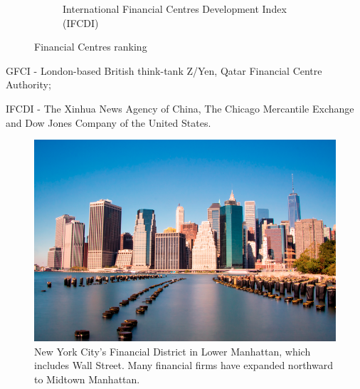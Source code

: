 \documentclass[international_finance_p1.tex]{subfiles}
\begin{document}
\begin{frame}[shrink=20]
\begin{figure}
\begin{subfigure}[t]{5.1cm}
		\caption{International Financial Centres Development Index (IFCDI)}\label{fig:b_fin_centers_index}
	\end{subfigure}
	\caption{Financial Centres ranking}\label{fig:df_and_cdf}
\end{figure}
\footnotesize{GFCI - London-based British think-tank Z/Yen, Qatar Financial Centre Authority;

IFCDI - The Xinhua News Agency of China, The Chicago Mercantile Exchange and Dow Jones Company of the United States.}
\end{frame}

\begin{frame}
\begin{figure}
\centering
\includegraphics[scale=0.25]{img/new_york}
\caption{New York City's Financial District in Lower Manhattan, which includes Wall Street. Many financial firms have expanded northward to Midtown Manhattan.}
\end{figure}
\end{frame}
\end{document}
